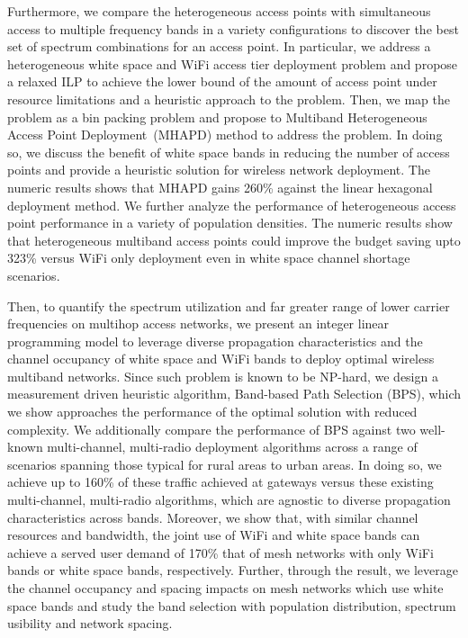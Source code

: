 Furthermore, we compare the heterogeneous access points with simultaneous access 
to multiple frequency bands in a variety configurations to discover the best set 
of spectrum combinations for an access point. In particular, we address a 
heterogeneous white space and WiFi access tier deployment problem and propose a 
relaxed ILP to achieve the lower bound of the amount of access point under resource 
limitations and a heuristic approach to the problem. Then, we map the problem as a 
bin packing problem and propose to Multiband Heterogeneous Access Point 
Deployment~(MHAPD) method to address the problem. In doing so, we discuss the benefit 
of white space bands in reducing the number of access points and provide a heuristic 
solution for wireless network deployment. The numeric results shows that MHAPD gains 
260\% against the linear hexagonal deployment method.  We further analyze the 
performance of heterogeneous access point performance in a variety of population 
densities. The numeric results show that heterogeneous multiband access points could 
improve the budget saving upto 323\% versus WiFi only deployment even in white space
channel shortage scenarios. 

Then, to quantify the spectrum utilization and far greater range of lower carrier 
frequencies on multihop access networks, we present an integer linear programming 
model to leverage diverse propagation characteristics and the channel occupancy of 
white space and WiFi bands to deploy optimal wireless multiband networks. Since 
such problem is known to be NP-hard, we design a measurement driven heuristic 
algorithm, Band-based Path Selection (BPS), which we show approaches the performance 
of the optimal solution with reduced complexity.  We additionally compare the 
performance of BPS against two well-known multi-channel, multi-radio deployment 
algorithms across a range of scenarios spanning those typical for rural areas to 
urban areas. In doing so, we achieve up to 160\% of these traffic achieved at gateways 
versus these existing multi-channel, multi-radio algorithms, which are agnostic to 
diverse propagation characteristics across bands.  Moreover, we show that, with similar 
channel resources and bandwidth, the joint use of WiFi and white space bands can achieve 
a served user demand of 170\% that of mesh networks with only WiFi bands or white space 
bands, respectively. Further, through the result, we leverage the channel occupancy and 
spacing impacts on mesh networks which use white space bands and study the band selection
with population distribution, spectrum usibility and network spacing.

